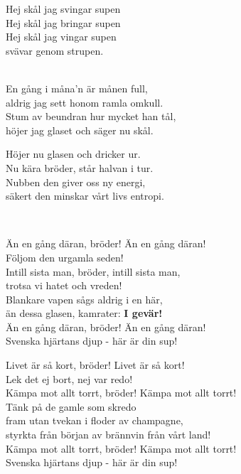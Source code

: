Hej skål jag svingar supen\\
Hej skål jag bringar supen\\
Hej skål jag vingar supen\\
svävar genom strupen.\\

 \\       

\songtext{}
En gång i måna'n är månen full,\\
aldrig jag sett honom ramla omkull.\\
Stum av beundran hur mycket han tål,\\
höjer jag glaset och säger nu skål.

Höjer nu glasen och dricker ur.\\
Nu kära bröder, står halvan i tur.\\
Nubben den giver oss ny energi,\\
säkert den minskar vårt livs entropi.\\

\newpage


 \\       

\songtext{}
Än en gång däran, bröder! Än en gång däran!\\
Följom den urgamla seden!\\
Intill sista man, bröder, intill sista man,\\
trotsa vi hatet och vreden!\\
Blankare vapen sågs aldrig i en här,\\
än dessa glasen, kamrater: \textbf{I gevär!}\\
Än en gång däran, bröder! Än en gång däran!\\
Svenska hjärtans djup - här är din sup!

Livet är så kort, bröder! Livet är så kort!\\
Lek det ej bort, nej var redo!\\
Kämpa mot allt torrt, bröder! Kämpa mot allt torrt!\\
Tänk på de gamle som skredo\\
fram utan tvekan i floder av champagne,\\
styrkta från början av brännvin från vårt land!\\
Kämpa mot allt torrt, bröder! Kämpa mot allt torrt!\\
Svenska hjärtans djup - här är din sup!\\

